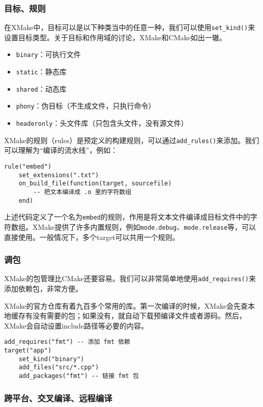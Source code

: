 \documentclass[../main.tex]{subfiles}
\begin{document}
\subsubsection{目标、规则}

在XMake中，目标可以是以下种类当中的任意一种，我们可以使用\texttt{set\_kind()}来设置目标类型。关于目标和作用域的讨论，XMake和CMake如出一辙。
\begin{itemize}
    \item \texttt{binary}：可执行文件
    \item \texttt{static}：静态库
    \item \texttt{shared}：动态库
    \item \texttt{phony}：伪目标（不生成文件，只执行命令）
    \item \texttt{headeronly}：头文件库（只包含头文件，没有源文件）
\end{itemize}

XMake的规则（rules）是预定义的构建规则，可以通过\texttt{add\_rules()}来添加。我们可以理解为“编译的流水线”，例如：
\begin{lstlisting}
rule("embed")
    set_extensions(".txt")
    on_build_file(function(target, sourcefile)
        -- 把文本编译成 .o 里的字符数组
    end)
\end{lstlisting}
上述代码定义了一个名为\texttt{embed}的规则，作用是将文本文件编译成目标文件中的字符数组。XMake提供了许多内置规则，例如\texttt{mode.debug}、\texttt{mode.release}等，可以直接使用。一般情况下，多个target可以共用一个规则。

\subsubsection{调包}

XMake的包管理比CMake还要容易。我们可以非常简单地使用\texttt{add\_requires()}来添加依赖包，非常方便。

XMake的官方仓库有着九百多个常用的库。第一次编译的时候，XMake会先查本地缓存有没有需要的包；如果没有，就自动下载预编译文件或者源码。然后，XMake会自动设置include路径等必要的内容。

\begin{lstlisting}
add_requires("fmt") -- 添加 fmt 依赖
target("app")
    set_kind("binary")
    add_files("src/*.cpp")
    add_packages("fmt") -- 链接 fmt 包
\end{lstlisting}

\subsubsection{跨平台、交叉编译、远程编译}
\end{document}
